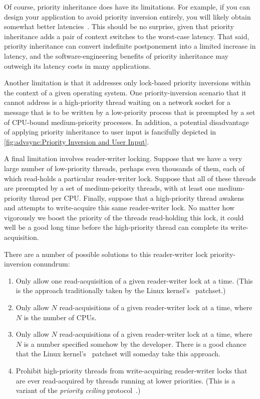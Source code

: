 Of course, priority inheritance does have its limitations.
For example, if you can design your application to avoid priority
inversion entirely, you will likely obtain somewhat better
latencies~\cite{VictorYodaiken2004a}.
This should be no surprise, given that priority inheritance adds
a pair of context switches to the worst-case latency.
That said, priority inheritance can convert indefinite postponement
into a limited increase in latency, and the software-engineering
benefits of priority inheritance may outweigh its latency costs in
many applications.

Another limitation is that it addresses only lock-based priority
inversions within the context of a given operating system.
One priority-inversion scenario that it cannot address is a high-priority
thread waiting on a network socket for a message that is to be written
by a low-priority process that is preempted by a set of CPU-bound
medium-priority processes.
In addition, a potential disadvantage of applying priority inheritance
to user input is fancifully depicted in
\cref{fig:advsync:Priority Inversion and User Input}.

A final limitation involves reader-writer locking.
Suppose that we have a very large number of low-priority threads, perhaps
even thousands of them, each
of which read-holds a particular reader-writer lock.
Suppose that all of these threads are preempted by a set of medium-priority
threads, with at least one medium-priority thread per CPU\@.
Finally, suppose that a high-priority thread awakens and attempts to
write-acquire this same reader-writer lock.
No matter how vigorously we boost the priority of the threads read-holding
this lock, it could well be a good long time before the high-priority
thread can complete its write-acquisition.

There are a number of possible solutions to this reader-writer lock
priority-inversion conundrum:

\begin{enumerate}
\item	Only allow one read-acquisition of a given reader-writer lock
	at a time.  (This is the approach traditionally taken by
	the Linux kernel's \rt\ patchset.)
\item	Only allow $N$ read-acquisitions of a given reader-writer lock
	at a time, where $N$ is the number of CPUs.
\item	Only allow $N$ read-acquisitions of a given reader-writer lock
	at a time, where $N$ is a number specified somehow by the
	developer.
	There is a good chance that the Linux kernel's \rt\ patchset
	will someday take this approach.
\item	Prohibit high-priority threads from write-acquiring reader-writer
	locks that are ever read-acquired by threads running at lower
	priorities.
	(This is a variant of the \emph{priority ceiling}
	protocol~\cite{LuiSha1990PriorityInheritance}.)
\end{enumerate}


